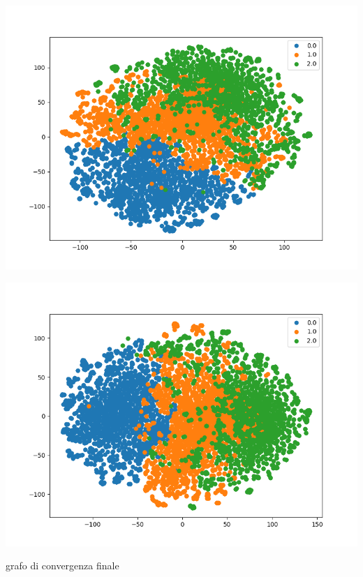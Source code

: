 \documentclass[11pt]{article}
\begin{document}
\begin{center}
\begin{minipage}{0.3\linewidth}
    \end{minipage}
    \begin{minipage}{0.3\linewidth}
    \includegraphics[width=\linewidth]{TML-TSNE-45.png}
    \end{minipage}
    \begin{minipage}{0.3\linewidth}
    \includegraphics[width=\linewidth]{TML-TSNE-60.png}
    \end{minipage}
\end{center}

\begin{center}
    grafo di convergenza finale
\end{center}
\end{document}
